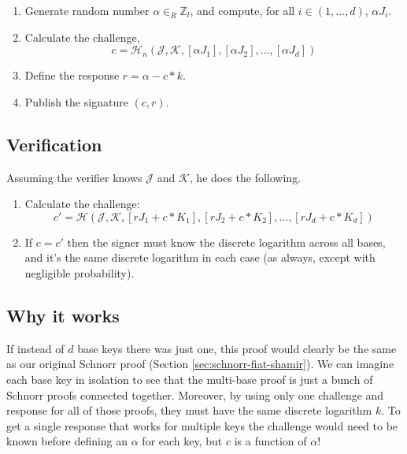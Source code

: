 \begin{enumerate}
	\item Generate random number $\alpha \in_R \mathbb{Z}_l$, and compute, for all $i \in (1,...,d)$, $\alpha J_i$.
	\item Calculate the challenge,\vspace{.175cm}
	\[c = \mathcal{H}_n(\mathcal{J},\mathcal{K},[\alpha J_1],[\alpha J_2],...,[\alpha J_d])\]
	\item Define the response $r = \alpha - c*k$.
	\item Publish the signature $(c, r)$.
\end{enumerate}


\subsection*{Verification}

Assuming the verifier knows $\mathcal{J}$ and $\mathcal{K}$, he does the following.

\begin{enumerate}
	\item Calculate the challenge:\vspace{.175cm}
	\[c' = \mathcal{H}(\mathcal{J},\mathcal{K},[r J_1 + c*K_1],[r J_2 + c*K_2],...,[r J_d + c*K_d])\]
	\item If $c = c'$ then the signer must know the discrete logarithm across all bases, and it's the same discrete logarithm in each case (as always, except with negligible probability).
\end{enumerate}


\subsection*{Why it works}

If instead of $d$ base keys there was just one, this proof would clearly be the same as our original Schnorr proof (Section \ref{sec:schnorr-fiat-shamir}). We can imagine each base key in isolation to see that the multi-base proof is just a bunch of Schnorr proofs connected together. Moreover, by using only one challenge and response for all of those proofs, they must have the same discrete logarithm $k$. To get a single response that works for multiple keys the challenge would need to be known before defining an $\alpha$ for each key, but $c$ is a function of $\alpha$!



